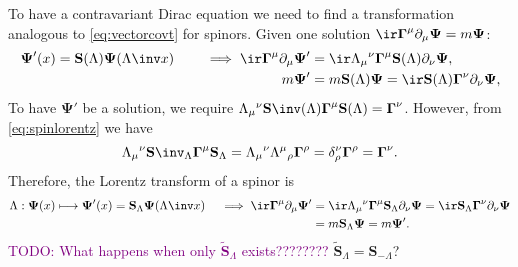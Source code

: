 \documentclass[11pt]{article}
\newcommand{\todo}[1]{\textcolor{purple}{TODO: #1}}
\newcommand{\Gammab}{\boldsymbol{\Gamma}}
\renewcommand{\S}{\mathbf{S}}
\newcommand{\St}{\widetilde{\S}}
\newcommand{\Psib}{\boldsymbol{\Psi}}
\begin{document}
To have a contravariant Dirac equation we need to find a transformation analogous to \cref{eq:vectorcovt} for spinors.
Given one solution \(\ir \Gammab^\mu \partial_\mu \Psib = m \Psib\):
%
\begin{equation*}
\begin{aligned}
  \Psib'(x) = \S(\Lambda) \Psib(\Lambda\inv x)
  \qquad\implies
  \ir \Gammab^\mu \partial_\mu \Psib'
    &= \ir \Lambda_\mu{}^\nu \Gammab^\mu \S(\Lambda) \partial_\nu \Psib, \\
  m \Psib' &= m \S(\Lambda) \Psib
    = \ir \S(\Lambda) \Gammab^\nu \partial_\nu \Psib,
\end{aligned}
\end{equation*}
%
To have \(\Psib'\) be a solution, we require \(\Lambda_\mu{}^\nu \S\inv(\Lambda) \Gammab^\mu \S(\Lambda) = \Gammab^\nu\).
However, from \cref{eq:spinlorentz} we have
%
\begin{equation*}
  \Lambda_\mu{}^\nu \S\inv_\Lambda \Gammab^\mu \S_\Lambda 
    = \Lambda_\mu{}^\nu \Lambda^\mu{}_\rho \Gammab^\rho
    = \delta^\nu_\rho \Gammab^\rho 
    = \Gammab^\nu.
\end{equation*}
%
Therefore, the Lorentz transform of a spinor is
%
\begin{equation}\label{eq:diraccovt}
\begin{aligned}
  \Lambda: \Psib(x) \longmapsto \Psib'(x) = \S_\Lambda \Psib(\Lambda\inv x)
  \quad \implies
  \ir \Gammab^\mu \partial_\mu \Psib'
    &= \ir \Lambda_\mu{}^\nu \Gammab^\mu \S_\Lambda \partial_\nu \Psib
    = \ir \S_\Lambda \Gammab^\nu \partial_\nu \Psib \\
    &= m \S_\Lambda \Psib
    = m \Psib'.
\end{aligned}
\end{equation}
%
\todo{What happens when only \(\St_\Lambda\) exists????????} \(\St_\Lambda = \S_{-\Lambda}\)?
\end{document}
